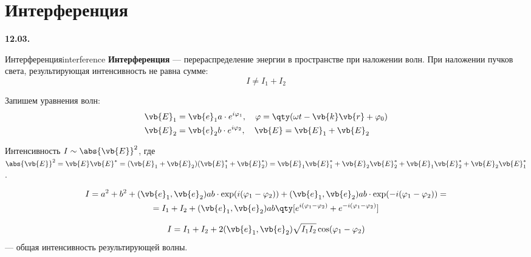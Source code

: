 \section{Интерференция}

\textbf{12.03.}

\begin{definition}{Интерференция}{interference}
	\textbf{Интерференция} --- перераспределение энергии в пространстве при наложении волн. При наложении пучков света, результирующая интенсивность не равна сумме:
	\begin{equation*}
		I \neq I_1 + I_2
	\end{equation*}
\end{definition}

Запишем уравнения волн:
\begin{align*}
	\vb{E}_1 &= \vb{e}_1 a \cdot e^{i \varphi_1}, \quad \varphi = \qty(\omega t - \vb{k}\vb{r} + \varphi_0) \\
	\vb{E}_2 &= \vb{e}_2 b \cdot e^{i \varphi_2}, \quad \vb{E} = \vb{E}_1 + \vb{E}_2
\end{align*}

Интенсивность $I \sim \abs{\vb{E}}^2$, где $\abs{\vb{E}}^2 = \vb{E}\vb{E}^* = (\vb{E}_1 + \vb{E}_2)(\vb{E}_1^* + \vb{E}_2^*) = \vb{E}_1\vb{E}_1^* + \vb{E}_2\vb{E}_2^* + \vb{E}_1\vb{E}_2^* + \vb{E}_2\vb{E}_1^*$.

\begin{multline*}
	I = a^2 + b^2 + (\vb{e}_1, \vb{e}_2) ab \cdot \exp(i(\varphi_1 - \varphi_2)) + (\vb{e}_1, \vb{e}_2) ab \cdot \exp(-i(\varphi_1 - \varphi_2)) = \\
	= I_1 + I_2 + (\vb{e}_1, \vb{e}_2) ab \qty[e^{i(\varphi_1 - \varphi_2)} + e^{-i(\varphi_1 - \varphi_2)}]
\end{multline*}

\begin{nb}
	\begin{equation}
		I = I_1 + I_2 + 2(\vb{e}_1, \vb{e}_2)\sqrt{I_1 I_2} \cos(\varphi_1 - \varphi_2)
	\end{equation}
	--- общая интенсивность результирующей волны.
\end{nb}

